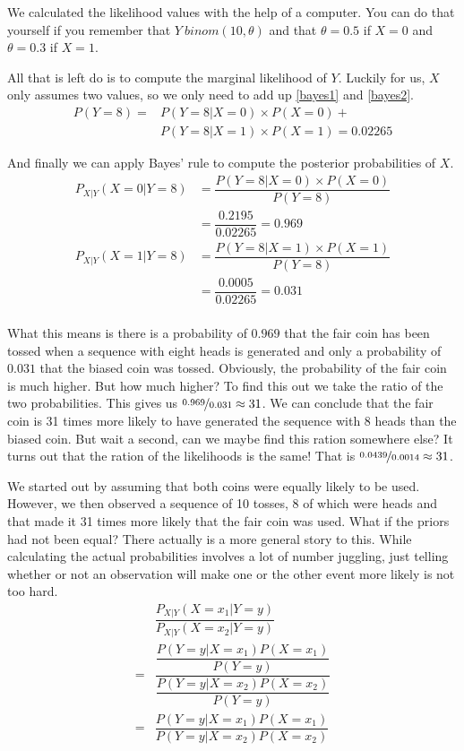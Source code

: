 We calculated the likelihood values with the help of a computer. You can do that yourself if you remember that
$ Y ~ binom(10,\theta) $ and that $ \theta=0.5 $ if $ X=0 $ and $ \theta=0.3 $ if $ X=1 $. 

All that is left do is to compute the marginal likelihood of $ Y $. Luckily for us, $ X $ only assumes two
values, so we only need to add up \ref{bayes1} and \ref{bayes2}.
\begin{align}
P(Y=8) = &P(Y=8|X=0) \times P(X=0) + \\
&P(Y=8|X=1) \times P(X=1) = 0.02265 \nonumber
\end{align}

And finally we can apply Bayes' rule to compute the posterior probabilities of $ X $.
\begin{align}
P_{X|Y}(X=0|Y=8) &= \dfrac{P(Y=8|X=0) \times P(X=0)}{P(Y=8)} \\
&= \dfrac{0.2195}{0.02265} = 0.969 \nonumber \\
P_{X|Y}(X=1|Y=8) &= \dfrac{P(Y=8|X=1) \times P(X=1)}{P(Y=8)} \\
&= \dfrac{0.0005}{0.02265} = 0.031 \nonumber \\
\end{align}

What this means is there is a probability of $ 0.969 $ that the fair coin has been tossed when a sequence with eight heads is
generated and only a probability of $ 0.031 $ that the biased coin was tossed. Obviously, the probability of the fair 
coin is much higher. But how much higher? To find this out we take the ratio of the two probabilities. This gives us 
$ \nicefrac{0.969}{0.031} \approx 31 $. We can conclude that the fair coin is 31 times more likely to have generated the sequence with
8 heads than the biased coin. But wait a second, can we maybe find this ration somewhere else? It turns out that 
the ration of the likelihoods is the same! That is $ \nicefrac{0.0439}{0.0014} \approx 31 $.

We started out by assuming that both coins were equally likely to be used. However, we then observed a sequence of 10 tosses, 8 of 
which were heads and that made it 31 times more likely that the fair coin was used. What if the priors had not been equal?
There actually is a more general story to this. While calculating the actual probabilities involves a lot of number juggling, just
telling whether or not an observation will make one or the other event more likely is not too hard.
\begin{align}
&\dfrac{P_{X|Y}(X=x_{1}|Y=y)}{P_{X|Y}(X=x_{2}|Y=y)} \\[1em]
=& \dfrac{\dfrac{P(Y=y|X=x_{1})P(X=x_{1})}{P(Y=y)}}{\dfrac{P(Y=y|X=x_{2})P(X=x_{2})}{P(Y=y)}} \\[1em]
=& \dfrac{P(Y=y|X=x_{1})P(X=x_{1})}{P(Y=y|X=x_{2})P(X=x_{2})}
\end{align}

